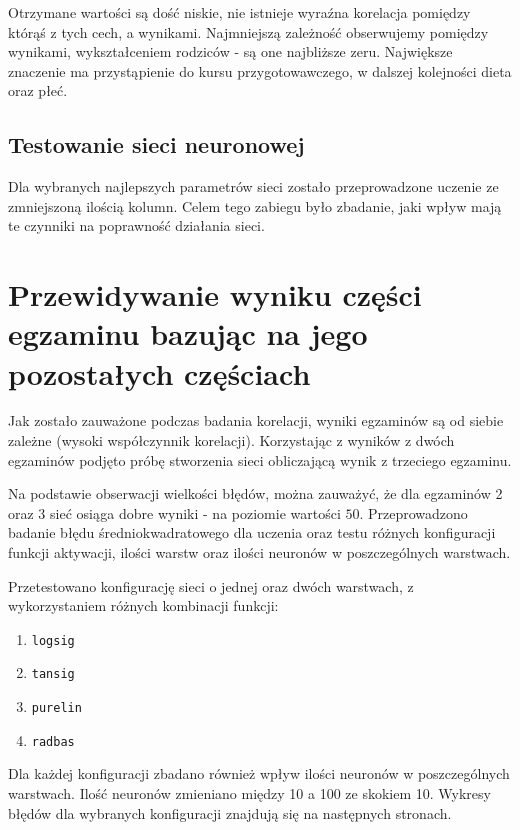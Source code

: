 \documentclass[12pt]{article}
\begin{document}
Otrzymane wartości są dość niskie, nie istnieje wyraźna korelacja pomiędzy którąś z tych cech, a wynikami. Najmniejszą zależność obserwujemy pomiędzy wynikami, wykształceniem rodziców - są one najbliższe zeru. Największe znaczenie ma przystąpienie do kursu przygotowawczego, w dalszej kolejności dieta oraz płeć.


\subsection{Testowanie sieci neuronowej}
Dla wybranych najlepszych parametrów sieci zostało przeprowadzone uczenie ze zmniejszoną ilością kolumn. Celem tego zabiegu było zbadanie, jaki wpływ mają te czynniki na poprawność działania sieci. %

\pagebreak
\section{Przewidywanie wyniku części egzaminu bazując na jego pozostałych częściach} %
Jak zostało zauważone podczas badania korelacji, wyniki egzaminów są od siebie zależne (wysoki współczynnik korelacji). Korzystając z wyników z dwóch egzaminów podjęto próbę stworzenia sieci obliczającą wynik z trzeciego egzaminu.

Na podstawie obserwacji wielkości błędów, można zauważyć, że dla egzaminów 2 oraz 3 sieć osiąga dobre wyniki - na poziomie wartości $50$.  Przeprowadzono badanie błędu średniokwadratowego dla uczenia oraz testu różnych konfiguracji funkcji aktywacji, ilości warstw oraz ilości neuronów w poszczególnych warstwach.

Przetestowano konfigurację sieci o jednej oraz dwóch warstwach, z wykorzystaniem różnych kombinacji funkcji:
\begin{enumerate}
\item \verb+logsig+
\item \verb+tansig+
\item \verb+purelin+
\item \verb+radbas+
\end{enumerate}
Dla każdej konfiguracji zbadano również wpływ ilości neuronów w poszczególnych warstwach. Ilość neuronów zmieniano między  10 a 100 ze skokiem 10. Wykresy błędów dla wybranych konfiguracji znajdują się na następnych stronach.
\end{document}
